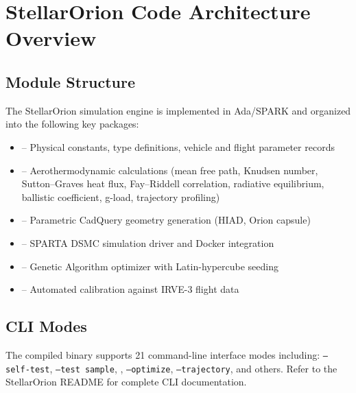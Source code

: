 \chapter{StellarOrion Code Architecture Overview}
\label{app:code_architecture}

\section{Module Structure}

The StellarOrion simulation engine is implemented in Ada/SPARK and organized into the following key packages:

\begin{itemize}
    \item \texttt{} -- Physical constants, type definitions, vehicle and flight parameter records
    \item \texttt{} -- Aerothermodynamic calculations (mean free path, Knudsen number, Sutton--Graves heat flux, Fay--Riddell correlation, radiative equilibrium, ballistic coefficient, g-load, trajectory profiling)
    \item \texttt{} -- Parametric CadQuery geometry generation (HIAD, Orion capsule)
    \item \texttt{} -- SPARTA DSMC simulation driver and Docker integration
    \item \texttt{} -- Genetic Algorithm optimizer with Latin-hypercube seeding
    \item \texttt{} -- Automated calibration against IRVE-3 flight data
\end{itemize}

\section{CLI Modes}

The compiled binary supports 21 command-line interface modes including: \texttt{--self-test}, \texttt{--test sample}, \texttt{}, \texttt{--optimize}, \texttt{--trajectory}, and others. Refer to the StellarOrion README for complete CLI documentation.

